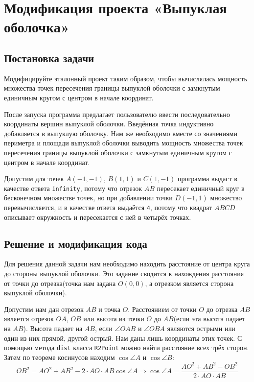 \section{Модификация проекта «Выпуклая оболочка»}
\subsection{Постановка задачи}

Модифицируйте эталонный проект таким образом, чтобы вычислялась мощность 
множества точек пересечения границы выпуклой оболочки 
с замкнутым единичным кругом с центром в начале координат.

После запуска программа предлагает пользователю ввести последовательно 
координаты вершин выпуклой оболочки. Введённая точка индуктивно 
добавляется в выпуклую оболочку. Нам же необходимо вместе со 
значениями периметра и площади выпуклой оболочки выводить мощность 
множества точек пересечения границы выпуклой оболочки 
с замкнутым единичным кругом с центром в начале координат.

Допустим для точек $A(-1,-1)$, $B(1,1)$ и $C(1,-1)$ программа выдаст 
в качестве ответа \verb|infinity|, потому что отрезок $AB$ 
пересекает единичный круг в бесконечном множестве точек, но при 
добавлении точки $D(-1,1)$ множество перевычисляется, и в качестве ответа 
выдаётся \verb|4|, потому что квадрат $ABCD$ описывает окружность и 
пересекается с ней в четырёх точках.

\subsection{Решение и модификация кода}

Для решения данной задачи нам необходимо находить расстояние от центра 
круга до стороны выпуклой оболочки. Это задание сводится к нахождения 
расстояния от точки до отрезка(точка нам задана $O(0,0)$, а отрезком 
является сторона выпуклой оболочки).

Допустим нам дан отрезок $AB$ и точка $O$. Расстоянием от точки $O$ 
до отрезка $AB$ является отрезок $OA$, $OB$ или высота из точки $O$ 
до $AB$(если эта высота падает на $AB$). Высота падает 
на $AB$, если $\angle OAB$ и $\angle OBA$ являются острыми или 
один из них прямой, другой острый. Нам даны лишь координаты этих точек. 
С помощью метода \verb|dist| класса \verb|R2Point| можно найти 
расстояние всех трёх сторон. Затем по теореме косинусов находим 
$\cos\angle A$ и $\cos\angle B$:
$$OB^2 = AO^2+AB^2-2\cdot AO\cdot AB\cos\angle A \Rightarrow 
\cos\angle A = \frac{AO^2+AB^2-OB^2}{2\cdot AO\cdot AB}$$

